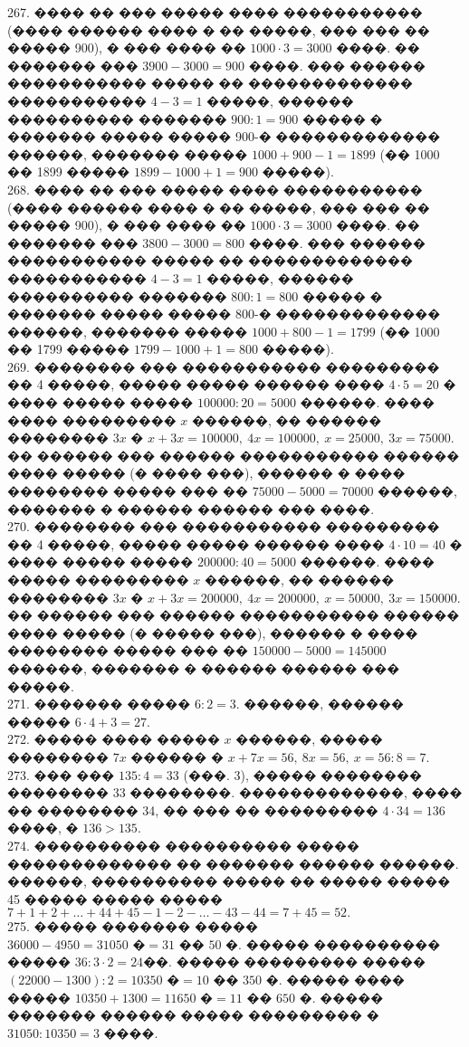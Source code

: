 \documentclass[12pt]{article}
\begin{document}
267. ���� �� ��� ����� ���� ����������� (���� ������ ���� � �� �����, ��� ��� �� ����� 900), � ��� ���� �� $1000\cdot3=3000$ ����. �� ������� ��� $3900-3000=900$ ����. ��� ������ ����������� ����� �� ������������� ����������� $4-3=1$ �����, ������ ���������� ������� $900:1=900$ ����� � ������� ����� ����� 900-� ������������� ������, ������� ����� $1000+900-1=1899$ (�� 1000 �� 1899 ����� $1899-1000+1=900$ �����).\\
268. ���� �� ��� ����� ���� ����������� (���� ������ ���� � �� �����, ��� ��� �� ����� 900), � ��� ���� �� $1000\cdot3=3000$ ����. �� ������� ��� $3800-3000=800$ ����. ��� ������ ����������� ����� �� ������������� ����������� $4-3=1$ �����, ������ ���������� ������� $800:1=800$ ����� � ������� ����� ����� 800-� ������������� ������, ������� ����� $1000+800-1=1799$ (�� 1000 �� 1799 ����� $1799-1000+1=800$ �����).\\
269. �������� ��� ����������� ��������� �� 4 �����, ����� ����� ������ ���� $4\cdot5=20$ � ���� ����� ����� $100000:20=5000$ ������. ���� ���� ��������� $x$ ������, �� ������ �������� $3x$ � $x+3x=100000,\ 4x=100000,\ x=25000,\ 3x=75000.$ �� ������ ��� ������ ����������� ������ ���� ����� (� ���� ���), ������ � ���� �������� ����� ��� �� $75000-5000=70000$ ������, ������� � ������ ������ ��� ����.\\
270. �������� ��� ����������� ��������� �� 4 �����, ����� ����� ������ ���� $4\cdot10=40$ � ���� ����� ����� $200000:40=5000$ ������. ���� ����� ��������� $x$ ������, �� ������ �������� $3x$ � $x+3x=200000,\ 4x=200000,\ x=50000,\ 3x=150000.$ �� ������ ��� ������ ����������� ������ ���� ����� (� ����� ���), ������ � ���� �������� ����� ��� �� $150000-5000=145000$ ������, ������� � ������ ������ ��� �����.\\
271. ������� ����� $6:2=3.$ ������, ������ ����� $6\cdot4+3=27.$\\
272. ����� ���� ����� $x$ ������, ����� ��������  $7x$ ������ � $x+7x=56,\ 8x=56,\ x=56:8=7.$\\
273. ��� ��� $135:4=33$ (���. 3), ����� �������� �������� 33 ��������. �������������, ���� �� �������� 34, �� ��� �� ��������� $4\cdot34=136$ ����, � $136>135.$\\
274. ���������� ���������� ����� ������������� �� ������� ������ ������. ������, ���������� ����� �� ����� ����� 45 ����� ����� ����� $7+1+2+\ldots+44+45-1-2-\ldots-43-44=7+45=52.$\\
275. ����� ������� ����� $36000-4950=31050\text{ �}=31\text{ �� }50\text{ �}.$ ����� ���������� ����� $36:3\cdot2=24$��. ����� ��������� ����� $(22000-1300):2=10350\text{ �}=10\text{ �� }350\text{ �}.$ ����� ���� ����� $10350+1300=11650\text{ �}=11\text{ �� }650\text{ �}.$ ����� ������� ������ ����� ��������� � $31050:10350=3$ ����.\\
\end{document}
